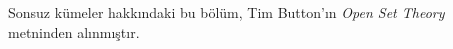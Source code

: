 \documentclass[../../../include/open-logic-chapter]{subfiles}
\begin{document}

\begin{editorial}
Sonsuz kümeler hakkındaki bu bölüm, Tim Button'ın \emph{Open Set Theory}
metninden alınmıştır.
\end{editorial}

\end{document}
